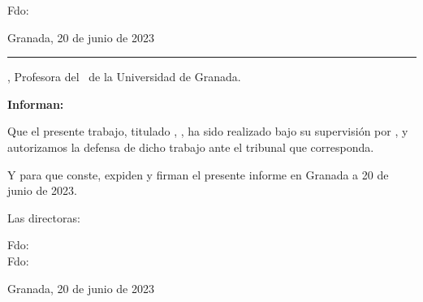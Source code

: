 \documentclass[
11pt, %
english, %
singlespacing, %
headsepline, %
]{MastersDoctoralThesis} %
\begin{document}
{
  \large
  Fdo: \textbf{\authorname}
}

\begin{flushright}
  \large Granada, 20 de junio de 2023
\end{flushright}




\pagestyle{empty}
\cleardoublepage

\par\noindent\rule{\textwidth}{2pt}

\vspace{2cm}

{\large

  \supname, Profesora del \deptname \ de la Universidad de Granada.

  \vspace{0.5cm}



  \vspace{1cm}

  \noindent\textbf{Informan:}

  \vspace{0.5cm}

  Que el presente trabajo, titulado \textbf{\ttitle}, \textbf{\thesissubtitle}, ha sido realizado bajo su supervisión por \textbf{\authorname}, y autorizamos la defensa de dicho trabajo ante el tribunal que corresponda.

  \vspace{0.5cm}

  Y para que conste, expiden y firman el presente informe en Granada a 20 de junio de 2023.


}
\vfill

{
  \large

  Las directoras:
  \vspace{4cm}

  Fdo: \textbf{\supname} \\
  Fdo: \textbf{\supervisorB}
}

\begin{flushright}
  \large Granada, 20 de junio de 2023
\end{flushright}
\end{document}
